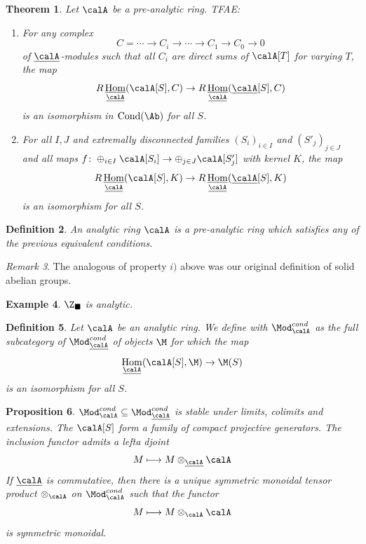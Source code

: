 \documentclass[A4paper, british]{amsart}
\theoremstyle{darkgreentheorem}
\newtheorem{thm}{Theorem}[section]
\newtheorem{prop}[thm]{Proposition}
\theoremstyle{darkbluedefinition}
\newtheorem{defn}[thm]{Definition}
\theoremstyle{darkredexample}
\newtheorem{exa}[thm]{Example}
\theoremstyle{remark}
\newtheorem{rem}[thm]{Remark}
\DeclareMathOperator{\Hom}{Hom}
\DeclareMathOperator{\Cond}{Cond}
\DeclareMathOperator{\ihom}{\underline{Hom}}
\newcommand{\1}{\mathbbm{1}}
\renewcommand{\u}[1]{\underline{#1}}
\newcommand{\ot}{\otimes}
\newcommand{\op}{\oplus}
\newcommand{\sub}{\subseteq}
\newcommand{\usolid}{_{\blacksquare}}
\begin{document}
\begin{thm}
    Let $\calA$ be a pre-analytic ring.
    TFAE:
    \begin{enumerate}[label=\roman*)]
	\item For any complex
	    \[ C=\cdots \to C_{i}\to \cdots\to C_{1}\to C_{0}\to 0 \]
	    of $\u{\calA}$-modules such that all $C_{i}$ are direct sums of $\calA[T]$ for varying $T$, the map
	    \[ R\ihom_{\u{\calA}}(\calA[S],C)\to R\ihom_{\u{\calA}}(\u{\calA}[S],C) \]
	    is an isomorphism in $\Cond(\Ab)$ for all $S$.
	\item For all $I,J$ and extremally disconnected families $(S_{i})_{i\in I}$ and $(S'_{j})_{j\in J}$ and all maps $f\colon \op_{i\in I}\calA[S_{i}]\to \op_{j\in J}\calA[S'_{j}]$ with kernel $K$, the map
	    \[ R\ihom_{\u{\calA}}(\calA[S],K)\to R\ihom_{\u{\calA}}(\u{\calA}[S],K) \]
	    is an isomorphism for all $S$.
    \end{enumerate}
\end{thm}

\begin{defn}
    An \textit{analytic ring} $\calA$ is a pre-analytic ring which satisfies any of the previous equivalent conditions.
\end{defn}

\begin{rem}
    The analogous of property $i)$ above was our original definition of solid abelian groups.
\end{rem}

\begin{exa}
    $\Z\usolid$ is analytic.
\end{exa}

\begin{defn}
    Let $\calA$ be an analytic ring.
    We define with $\Mod_{\calA}^{cond}$ as the full subcategory of $\Mod_{\u{\calA}}^{cond}$ of objects $\M$ for which the map
    \[ \Hom_{\u{\calA}}(\calA[S],\M)\to \M(S) \]
    is an isomorphism for all $S$.
\end{defn}

\begin{prop}
    $\Mod_{\calA}^{cond}\sub \Mod_{\u{\calA}}^{cond}$ is stable under limits, colimits and extensions.
    The $\calA[S]$ form a family of compact projective generators.
    The inclusion functor admits a lefta djoint
    \[ M\longmapsto M\ot_{\u{\calA}}\calA \]
    If $\u{\calA}$ is commutative, then there is a unique symmetric monoidal tensor product $\ot_{\calA}$ on $\Mod_{\calA}^{cond}$ such that the functor
    \[ M\longmapsto M\ot_{\calA}\calA \]
    is symmetric monoidal.
\end{prop}
\end{document}

